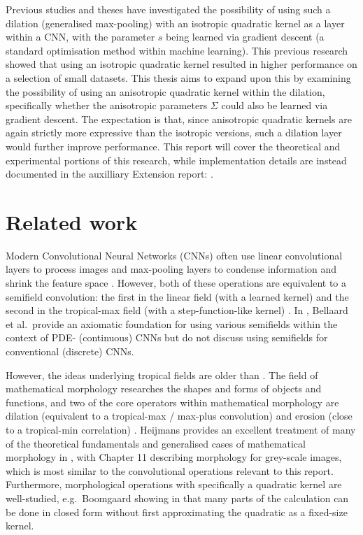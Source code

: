 \documentclass[a4paper, 12pt]{report}
\begin{document}
Previous studies \cite{groenendijk2022morphpool} and theses \cite{thierrybsc, koenbsc} have investigated the possibility of using such a dilation (generalised max-pooling) with an isotropic quadratic kernel as a layer within a CNN, with the parameter $s$ being learned via gradient descent (a standard optimisation method within machine learning). This previous research showed that using an isotropic quadratic kernel resulted in higher performance on a selection of small datasets. This thesis aims to expand upon this by examining the possibility of using an anisotropic quadratic kernel within the dilation, specifically whether the anisotropic parameters $\Sigma$ could also be learned via gradient descent. The expectation is that, since anisotropic quadratic kernels are again strictly more expressive than the isotropic versions, such a dilation layer would further improve performance. This report will cover the theoretical and experimental portions of this research, while implementation details are instead documented in the auxilliary Extension report: \cite{extension}.

\newpage
\section{Related work}
Modern Convolutional Neural Networks (CNNs) often use linear convolutional layers to process images and max-pooling layers to condense information and shrink the feature space \cite{introconvnets}. However, both of these operations are equivalent to a semifield convolution: the first in the linear field (with a learned kernel) and the second in the tropical-max field (with a step-function-like kernel) \cite{bellaardaxiomatic}. In \cite{bellaardaxiomatic}, Bellaard et al.\ provide an axiomatic foundation for using various semifields within the context of PDE- (continuous) CNNs but do not discuss using semifields for conventional (discrete) CNNs. 

However, the ideas underlying tropical fields are older than \cite{bellaardaxiomatic}. The field of mathematical morphology researches the shapes and forms of objects and functions, and two of the core operators within mathematical morphology are dilation (equivalent to a tropical-max / max-plus convolution) and erosion (close to a tropical-min correlation) \cite{maragos}. Heijmans provides an excellent treatment of many of the theoretical fundamentals and generalised cases of mathematical morphology in \cite{heijmans1996morphological}, with Chapter 11 describing morphology for grey-scale images, which is most similar to the convolutional operations relevant to this report. Furthermore, morphological operations with specifically a quadratic kernel are well-studied, e.g.\ Boomgaard showing in \cite{Boomgaard1999NumericalSS} that many parts of the calculation can be done in closed form without first approximating the quadratic as a fixed-size kernel.
\end{document}
